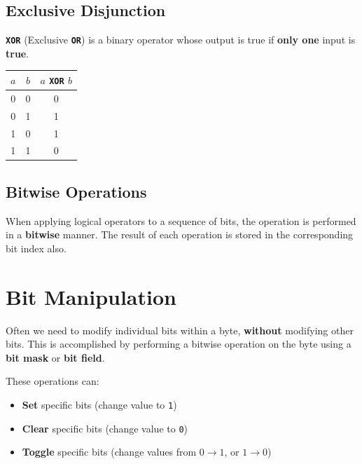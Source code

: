 \documentclass{report}
\newcommand{\keywordinline}[1]{\textcolor[rgb]{0.00,0.50,0.00}{\textbf{\texttt{#1}}}}
\begin{document}
\subsection{Exclusive Disjunction}
\keywordinline{XOR} (Exclusive \keywordinline{OR}) is a binary operator whose output is true if \textbf{only one} input is \textbf{true}.
\begin{table}[H]
    \centering
    \begin{tabular}{c c c}
        \toprule
        \textbf{\(a\)} & \textbf{\(b\)} & \(a\) \keywordinline{XOR} \(b\) \\
        \midrule
        0              & 0              & 0                               \\
        0              & 1              & 1                               \\
        1              & 0              & 1                               \\
        1              & 1              & 0                               \\
        \bottomrule
    \end{tabular}
\end{table}
\subsection{Bitwise Operations}
When applying logical operators to a sequence of bits, the operation is performed in a \textbf{bitwise} manner. The result of each operation is stored in the corresponding bit index also.
\section{Bit Manipulation}
Often we need to modify individual bits within a byte, \textbf{without} modifying other bits.
This is accomplished by performing a bitwise operation on the byte using a \textbf{bit mask} or \textbf{bit field}.

These operations can:
\begin{itemize}
    \item \textbf{Set} specific bits (change value to \texttt{1})
    \item \textbf{Clear} specific bits (change value to \texttt{0})
    \item \textbf{Toggle} specific bits (change values from \(0 \to 1\), or \(1 \to 0\))
\end{itemize}
\end{document}

